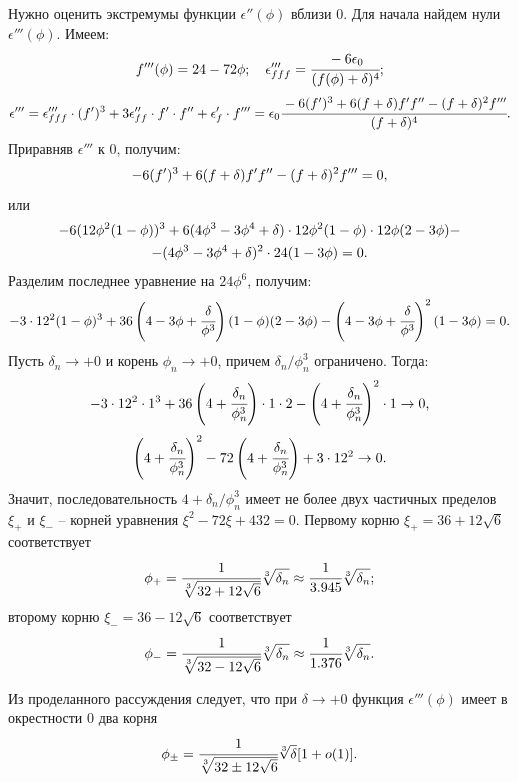 Нужно оценить экстремумы функции $\epsilon''(\phi)$ вблизи $0$. Для начала найдем нули $\epsilon'''(\phi)$. Имеем:
$$f'''(\phi) = 24 - 72 \phi; \quad \epsilon'''_{fff} = \cfrac{-6 \epsilon_0}{(f(\phi) + \delta)^4} {\text{;}}$$
\begin{equation}
	\epsilon''' = \epsilon'''_{fff} \cdot (f')^3 + 3 \epsilon''_{ff} \cdot f' \cdot f'' + \epsilon'_f \cdot f''' = \epsilon_0 \cfrac{-6 (f')^3 + 6 (f + \delta) f' f'' - (f + \delta)^2 f'''}{(f + \delta)^4} {\text{.}}
	\label{eq:epsilon_phi_phi_phi}
\end{equation}
Приравняв $\epsilon'''$ к $0$, получим:
$$-6 (f')^3 + 6 (f + \delta) f' f'' - (f + \delta)^2 f''' = 0 {\text{,}}$$
или
\begin{multline*}
	-6(12 \phi^2 (1 - \phi))^3 + 6(4 \phi^3 - 3\phi^4 + \delta) \cdot 12 \phi^2 (1 - \phi) \cdot 12 \phi (2 - 3\phi) - \\ - (4 \phi^3 - 3 \phi^4 + \delta)^2 \cdot 24 (1 - 3 \phi) = 0 {\text{.}}
\end{multline*}
Разделим последнее уравнение на $24\phi^6$, получим:
$$-3 \cdot 12^2 (1 - \phi)^3 + 36 \left(4 - 3\phi + \cfrac{\delta}{\phi^3} \right)(1 - \phi)(2 - 3\phi) - \left(4 - 3 \phi + \cfrac{\delta}{\phi^3} \right)^2 (1 - 3 \phi) = 0 {\text{.}}$$
Пусть $\delta_n \to +0$ и корень $\phi_n \to +0$, причем $\delta_n / \phi_n^3$ ограничено. Тогда:
$$-3 \cdot 12^2 \cdot 1^3 + 36 \left(4 + \cfrac{\delta_n}{\phi_n^3} \right) \cdot 1 \cdot 2 - \left(4 + \cfrac{\delta_n}{\phi_n^3} \right)^2 \cdot 1 \to 0 {\text{,}}$$
$$\left(4 + \cfrac{\delta_n}{\phi_n^3} \right)^2 - 72 \left(4 + \cfrac{\delta_n}{\phi_n^3} \right) + 3 \cdot 12^2 \to 0 {\text{.}}$$
Значит, последовательность $4 + \delta_n / \phi_n^3$ имеет не более двух частичных пределов $\xi_+$ и $\xi_-$ -- корней уравнения $\xi^2 - 72 \xi + 432 = 0$. Первому корню $\xi_+ = 36 + 12 \sqrt{6}$ соответствует
$$\phi_+ = \cfrac{1}{\sqrt[3]{32 + 12 \sqrt{6}}} \sqrt[3]{\delta_n} \approx \cfrac{1}{3.945} \sqrt[3]{\delta_n} {\text{;}}$$
второму корню $\xi_- = 36 - 12 \sqrt{6}$ соответствует
$$\phi_- = \cfrac{1}{\sqrt[3]{32 - 12 \sqrt{6}}} \sqrt[3]{\delta_n} \approx \cfrac{1}{1.376} \sqrt[3]{\delta_n} {\text{.}}$$

Из проделанного рассуждения следует, что при $\delta \to +0$ функция $\epsilon'''(\phi)$ имеет в окрестности $0$ два корня
\begin{equation}
	\phi_{\pm} = \cfrac{1}{\sqrt[3]{32 \pm 12 \sqrt{6}}} \sqrt[3]{\delta} [1 + o(1)] {\text{.}}
	\label{eq:epsilon_phi_phi_phi_roots}
\end{equation}

